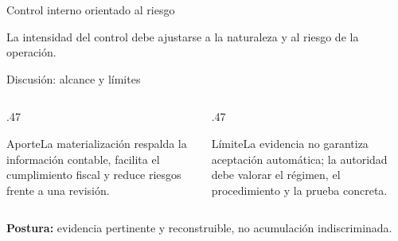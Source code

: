 \documentclass[spanish,aspectratio=169,xcolor={dvipsnames,table}]{beamer}
\begin{document}
\begin{frame}{Control interno orientado al riesgo}
  \begin{center}
  \end{center}
  \vfill\centering\small La intensidad del control debe ajustarse a la naturaleza y al riesgo de la operación.
\end{frame}

\begin{frame}{Discusión: alcance y límites}
  \begin{columns}[T]
    \begin{column}{.47\textwidth}\begin{block}{Aporte}\small La materialización respalda la información contable, facilita el cumplimiento fiscal y reduce riesgos frente a una revisión.\end{block}\end{column}
    \begin{column}{.47\textwidth}\begin{block}{Límite}\small La evidencia no garantiza aceptación automática; la autoridad debe valorar el régimen, el procedimiento y la prueba concreta.\end{block}\end{column}
  \end{columns}
  \vfill\centering\textbf{Postura:} evidencia pertinente y reconstruible, no acumulación indiscriminada.
\end{frame}
\end{document}
